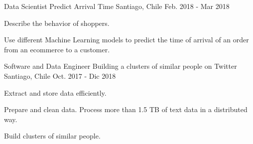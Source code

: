 \begin{cventries}
  \cventry
    {Data Scientist} %
    {Predict Arrival Time} %
    {Santiago, Chile} %
    {Feb. 2018 - Mar 2018} %
    {
      \begin{cvitems} %
        \item {Describe the behavior of shoppers.}
		\item {Use different Machine Learning models to predict the time of arrival of an order from an ecommerce to a customer.}        
      \end{cvitems}
    }
  \cventry
    {Software and Data Engineer} %
    {Building a clusters of similar people on Twitter} %
    {Santiago, Chile} %
    {Oct. 2017 - Dic 2018} %
    {
      \begin{cvitems} %
		\item {Extract and store data efficiently.}        
        \item {Prepare and clean data. Process more than 1.5 TB of text data in a distributed way.}
        \item {Build clusters of similar people.}
      \end{cvitems}
    }
\end{cventries}
